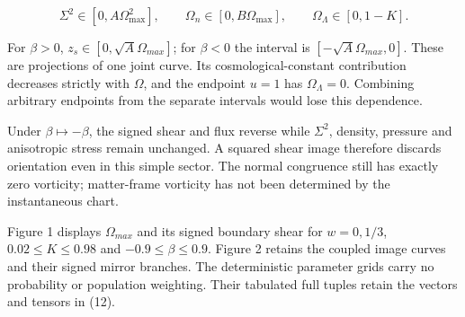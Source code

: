 \documentclass[aps,prd,reprint,onecolumn,nofootinbib]{revtex4-2}
\begin{document}
\[
 \Sigma^2\in[0,A\Omega_{\max}^2],\qquad
 \Omega_n\in[0,B\Omega_{\max}],\qquad
 \Omega_\Lambda\in[0,1-K].
 \tag{13}
\]

For \(\beta>0\), \(z_s\in[0,\sqrt A\Omega_{max}]\); for \(\beta<0\) the interval is \([-\sqrt A\Omega_{max},0]\). These are projections of one joint curve. Its cosmological-constant contribution decreases strictly with \(\Omega\), and the endpoint \(u=1\) has \(\Omega_\Lambda=0\). Combining arbitrary endpoints from the separate intervals would lose this dependence.

Under \(\beta\mapsto-\beta\), the signed shear and flux reverse while \(\Sigma^2\), density, pressure and anisotropic stress remain unchanged. A squared shear image therefore discards orientation even in this simple sector. The normal congruence still has exactly zero vorticity; matter-frame vorticity has not been determined by the instantaneous chart.

Figure 1 displays \(\Omega_{max}\) and its signed boundary shear for \(w=0,1/3\), \(0.02\le K\le 0.98\) and \(-0.9\le \beta\le 0.9\). Figure 2 retains the coupled image curves and their signed mirror branches. The deterministic parameter grids carry no probability or population weighting. Their tabulated full tuples retain the vectors and tensors in (12).
\end{document}
